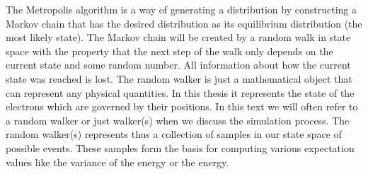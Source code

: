 The Metropolis algorithm is a way of generating a distribution by constructing a Markov chain that has the desired distribution as its equilibrium distribution (the most likely state). The 
Markov chain will be created by a random walk in state space with the property that the next step of the walk only depends on the current state and some random number. 
All information about how the current state was reached is lost. The random walker is just a mathematical object that can represent any physical quantities. In this thesis it represents the state of the electrons which are governed by their positions. In this text we will often refer to a random walker or
just walker(s) when we discuss the simulation process. The random walker(s) represents thus a collection of samples in our state space of possible events. These samples form the basis for computing various
expectation values like the variance of the energy or the energy.  
\newline

